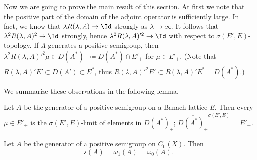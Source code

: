 Now we are going to prove the main result of this section. 
At first we note that the positive part of the domain of the adjoint operator is sufficiently large. 
In fact, we know that $\lambda R(\lambda,A) \to \Id $ strongly as $\lambda \to \infty$. 
It follows that $\lambda^2R(\lambda,A)^2 \to \Id $ strongly, hence $\lambda^2R(\lambda,A)'^2 \to \Id $ with respect to $\sigma(E',E)$-topology. 
If\/ $A$ generates a positive semigroup, then $\lambda^2R(\lambda,A)'^2\mu \in D(A^*)_{+} \coloneq D(A^*)\cap E'_{+}$ for $\mu \in E'_+$. 
(Note that $R(\lambda,A)'E' \subset D(A') \subset E^*$, thus $R(\lambda,A)'^2E' \subset R(\lambda,A)'E^* = D(A^*)$.)

We summarize these observations in the following lemma.
\begin{lemma}\label{lem:b4-1.3}%
Let $A$ be the generator of a positive semigroup on a Banach lattice $E$. Then every $\mu \in E'_+$ is the $\sigma(E',E)$-limit of elements in $D(A^*)_{+}$; \ie $\overline{D(A^*)_+}^{\sigma(E',E)} = E'_+$.
\end{lemma}
\begin{theorem}\label{thm:b4-1.4}%
Let $A$ be the generator of a positive semigroup on $C_{0}(X)$. 
Then
\[
   s(A) = \omega_1(A) = \omega_{0}(A).%
\]
\end{theorem}
